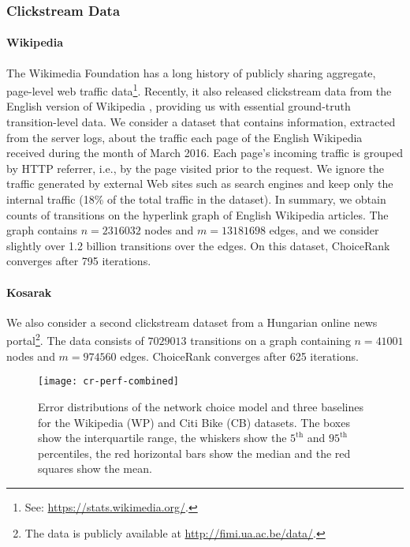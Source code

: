 \subsubsection{Clickstream Data}

\paragraph{Wikipedia}
The Wikimedia Foundation has a long history of publicly sharing aggregate, page-level web traffic data\footnote{See: \url{https://stats.wikimedia.org/}.}.
Recently, it also released clickstream data from the English version of Wikipedia \citep{wulczyn2016wikipedia}, providing us with essential ground-truth transition-level data.
We consider a dataset that contains information, extracted from the server logs, about the traffic each page of the English Wikipedia received during the month of March 2016.
Each page's incoming traffic is grouped by HTTP referrer, i.e., by the page visited prior to the request.
We ignore the traffic generated by external Web sites such as search engines and keep only the internal traffic (\num{18}\% of the total traffic in the dataset).
In summary, we obtain counts of transitions on the hyperlink graph of English Wikipedia articles.
The graph contains $n = \num{2316032}$ nodes and $m = \num{13181698}$ edges, and we consider slightly over \num{1.2} billion transitions over the edges.
On this dataset, ChoiceRank converges after \num{795} iterations.

\paragraph{Kosarak}
We also consider a second clickstream dataset from a Hungarian online news portal\footnote{The data is publicly available at \url{http://fimi.ua.ac.be/data/}.}.
The data consists of $\num{7029013}$ transitions on a graph containing $n = 41001$ nodes and $m = \num{974560}$ edges.
ChoiceRank converges after \num{625} iterations.

\begin{figure}
  \centering
  \texttt{[image: cr-perf-combined]}
  \caption{
Error distributions of the network choice model and three baselines for the Wikipedia (WP) and Citi Bike (CB) datasets.
The boxes show the interquartile range, the whiskers show the $5^{\text{th}}$ and $95^{\text{th}}$ percentiles, the red horizontal bars show the median and the red squares show the mean.
}
  \label{cr:fig:perf-combined}
\end{figure}

